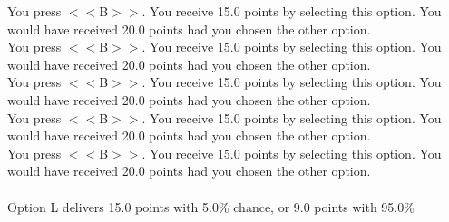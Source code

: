 \documentclass[pdflatex,sn-nature]{sn-jnl}%
\theoremstyle{thmstyleone}%
\theoremstyle{thmstyletwo}%
\theoremstyle{thmstylethree}%
\begin{document}
You press $<<$B$>>$. You receive 15.0 points by selecting this option. You would have received 20.0 points had you chosen the other option. $~$\\ 
You press $<<$B$>>$. You receive 15.0 points by selecting this option. You would have received 20.0 points had you chosen the other option. $~$\\ 
You press $<<$B$>>$. You receive 15.0 points by selecting this option. You would have received 20.0 points had you chosen the other option. $~$\\ 
You press $<<$B$>>$. You receive 15.0 points by selecting this option. You would have received 20.0 points had you chosen the other option. $~$\\ 
You press $<<$B$>>$. You receive 15.0 points by selecting this option. You would have received 20.0 points had you chosen the other option. $~$\\ 
 $~$\\ 
Option L delivers 15.0 points with 5.0\% chance, or 9.0 points with 95.0\% 
\end{document}
